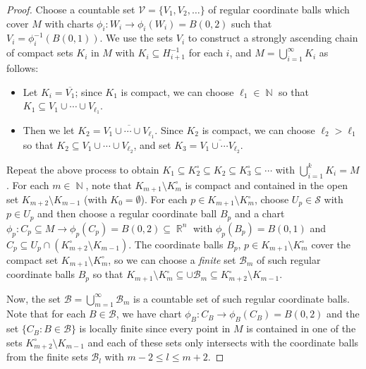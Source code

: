 \documentclass[11pt, a4paper]{memoir}
\DeclareMathOperator{\N}{{\mathbb{N}}}
\DeclareMathOperator{\R}{{\mathbb{R}}}
\theoremstyle{change}
\theoremstyle{plain}
\theoremstyle{nonumberplain}
\newtheorem{proof}{Proof}
\numberwithin{equation}{section}
\begin{document}
\begin{proof}
    Choose a countable set $\mathcal{V}=\{V_1,V_2,\ldots\}$ of regular coordinate balls which cover $M$ with charts $\phi_i:W_i\to\phi_i(W_i)=B(0,2)$ such that $V_i=\phi_i^{-1}(B(0,1))$.
    We use the sets $V_i$ to construct a strongly ascending chain of compact sets $K_i$ in $M$ with $K_i\subseteq H_{i+1}^{-1}$ for each $i$, and $M=\bigcup_{i=1}^\infty K_i$ as follows:
    \begin{itemize}[nl]
        \item Let $K_i=\overline{V_1}$; since $K_1$ is compact, we can choose $\ell_1\in\N$ so that $K_1\subseteq V_1\cup\cdots\cup V_{\ell_1}$.
        \item Then we let $K_2=\overline{V_1\cup\cdots\cup V_{\ell_1}}$.
            Since $K_2$ is compact, we can choose $\ell_2>\ell_1$ so that $K_2\subseteq V_1\cup\cdots\cup V_{\ell_2}$, and set $K_3=\overline{V_1\cup\cdots V_{\ell_2}}$.
    \end{itemize}
    Repeat the above process to obtain $K_1\subseteq K_2^\circ\subseteq K_2\subseteq K_3^\circ\subseteq\cdots$ with $\bigcup_{i=1}^kK_i=M$.
    For each $m\in\N$, note that $K_{m+1}\setminus K_m^\circ$ is compact and contained in the open set $K_{m+2}\setminus K_{m-1}$ (with $K_0=\emptyset$).
    For each $p\in K_{m+1}\setminus K_m^\circ$, choose $U_p\in\mathcal{S}$ with $p\in U_p$ and then choose a regular coordinate ball $B_p$ and a chart $\phi_p:C_p\subseteq M\to\phi_p(C_p)=B(0,2)\subseteq\R^n$ with $\phi_p(B_p)=B(0,1)$ and $C_p\subseteq U_p\cap(K_{m+2}^\circ\setminus K_{m-1})$.
    The coordinate balls $B_p$, $p\in K_{m+1}\setminus K_m^\circ$ cover the compact set $K_{m+1}\setminus K_m^\circ$, so we can choose a \textit{finite} set $\mathcal{B}_m$ of such regular coordinate balls $B_p$ so that $K_{m+1}\setminus K_m^\circ\subseteq\cup \mathcal{B}_m\subseteq K_{m+2}^\circ\setminus K_{m-1}$.

    Now, the set $\mathcal{B}=\bigcup_{m=1}^\infty\mathcal{B}_m$ is a countable set of such regular coordinate balls.
    Note that for each $B\in\mathcal{B}$, we have  chart $\phi_B:C_B\to\phi_B(C_B)=B(0,2)$ and the set $\{C_B:B\in\mathcal{B}\}$ is locally finite since every point in $M$ is contained in one of the sets $K_{m+2}^\circ\setminus K_{m-1}$ and each of these sets only intersects with the coordinate balls from the finite sets $\mathcal{B}_l$ with $m-2\leq l\leq m+2$.
\end{proof}
\end{document}
